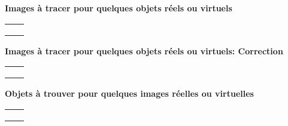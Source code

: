 \documentclass{article}
\newcommand{\titre}[1]{
\begin{center}
  {\Large\textbf{#1}}
\end{center}

}
\begin{document}
\setcounter{page}{1}
\titre{Images \`a tracer pour quelques objets r\'eels ou virtuels}
\begin{tabular}{|c|c|}
\hline
&\\ \hline
&\\ \hline
&\\ \hline
&\\ \hline
\end{tabular}


\newpage


\titre{Images \`a tracer pour quelques objets r\'eels ou virtuels: Correction}
\begin{tabular}{|c|c|}
\hline
&\\ \hline
&\\ \hline
&\\ \hline
&\\ \hline
\end{tabular}


\newpage

\titre{Objets \`a trouver pour quelques images r\'eelles ou virtuelles}
\begin{tabular}{|c|c|}
\hline
&\\ \hline
&\\ \hline
&\\ \hline
&\\ \hline
\end{tabular}


\newpage
\end{document}
